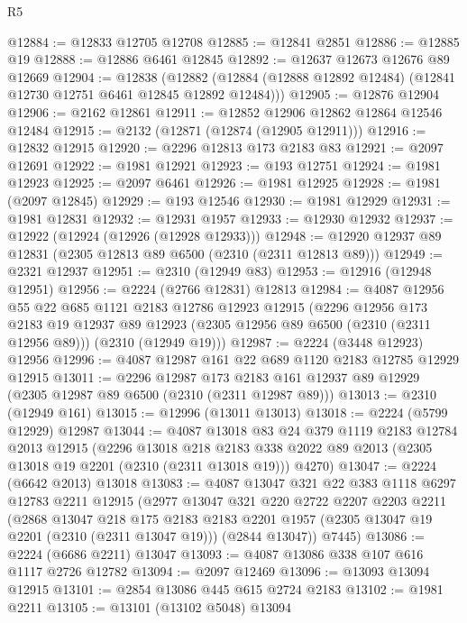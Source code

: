 \begin{lexlean}{R5}
\begin{coremodule}
@12884 := @12833 @12705 @12708
@12885 := @12841 @2851
@12886 := @12885 @19
@12888 := @12886 @6461 @12845
@12892 := @12637 @12673 @12676 @89 @12669
@12904 := @12838
    (@12882 (@12884 (@12888 @12892 @12484) (@12841 @12730 @12751 @6461 @12845 @12892 @12484)))
@12905 := @12876 @12904
@12906 := @2162 @12861
@12911 := @12852 @12906 @12862 @12864 @12546 @12484
@12915 := @2132 (@12871 (@12874 (@12905 @12911)))
@12916 := @12832 @12915
@12920 := @2296 @12813 @173 @2183 @83
@12921 := @2097 @12691
@12922 := @1981 @12921
@12923 := @193 @12751
@12924 := @1981 @12923
@12925 := @2097 @6461
@12926 := @1981 @12925
@12928 := @1981 (@2097 @12845)
@12929 := @193 @12546
@12930 := @1981 @12929
@12931 := @1981 @12831
@12932 := @12931 @1957
@12933 := @12930 @12932
@12937 := @12922 (@12924 (@12926 (@12928 @12933)))
@12948 := @12920 @12937 @89 @12831 (@2305 @12813 @89 @6500 (@2310 (@2311 @12813 @89)))
@12949 := @2321 @12937
@12951 := @2310 (@12949 @83)
@12953 := @12916 (@12948 @12951)
@12956 := @2224 (@2766 @12831) @12813
@12984 := @4087
    @12956
    @55
    @22
    @685
    @1121
    @2183
    @12786
    @12923
    @12915
    (@2296
      @12956
      @173
      @2183
      @19
      @12937
      @89
      @12923
      (@2305 @12956 @89 @6500 (@2310 (@2311 @12956 @89)))
      (@2310 (@12949 @19)))
@12987 := @2224 (@3448 @12923) @12956
@12996 := @4087 @12987 @161 @22 @689 @1120 @2183 @12785 @12929 @12915
@13011 := @2296
    @12987
    @173
    @2183
    @161
    @12937
    @89
    @12929
    (@2305 @12987 @89 @6500 (@2310 (@2311 @12987 @89)))
@13013 := @2310 (@12949 @161)
@13015 := @12996 (@13011 @13013)
@13018 := @2224 (@5799 @12929) @12987
@13044 := @4087
    @13018
    @83
    @24
    @379
    @1119
    @2183
    @12784
    @2013
    @12915
    (@2296
      @13018
      @218
      @2183
      @338
      @2022
      @89
      @2013
      (@2305 @13018 @19 @2201 (@2310 (@2311 @13018 @19)))
      @4270)
@13047 := @2224 (@6642 @2013) @13018
@13083 := @4087
    @13047
    @321
    @22
    @383
    @1118
    @6297
    @12783
    @2211
    @12915
    (@2977
      @13047
      @321
      @220
      @2722
      @2207
      @2203
      @2211
      (@2868
        @13047
        @218
        @175
        @2183
        @2183
        @2201
        @1957
        (@2305 @13047 @19 @2201 (@2310 (@2311 @13047 @19)))
        (@2844 @13047))
      @7445)
@13086 := @2224 (@6686 @2211) @13047
@13093 := @4087 @13086 @338 @107 @616 @1117 @2726 @12782
@13094 := @2097 @12469
@13096 := @13093 @13094 @12915
@13101 := @2854 @13086 @445 @615 @2724 @2183
@13102 := @1981 @2211
@13105 := @13101 (@13102 @5048) @13094

\end{coremodule}
\end{lexlean}
